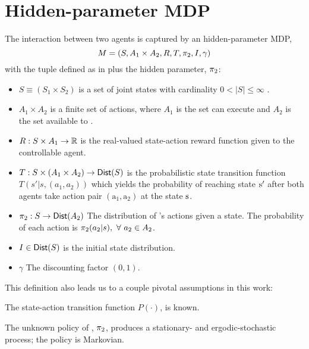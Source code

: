 \section{Hidden-parameter MDP}\label{sec:hipmdp}
    \begin{definition}
        The interaction between two agents is captured by an hidden-parameter \ac{MDP},
        \[
            M = (S, A_1 \times A_2, R, T, \pi_{2}, I , \gamma)
        \]
        with the tuple defined as in \cite{Sugiyama2015StatisticalRL} plus the hidden parameter, $\pi_{2}$:
        \begin{itemize}
                \item $S \equiv (S_1 \times S_2)$ is a set of joint states with cardinality $0 < |S| \leq \infty$ .
            \item $A_1\times A_2$ is a finite set of actions, where $A_1$ is the set  can execute and $A_2$ is
                the set available to .
            \item $R: S\times A_1 \rightarrow \mathbb{R}$ is the real-valued state-action reward function given to the
                controllable agent.
            \item $T: S\times (A_1\times A_2)\rightarrow \mathsf{Dist}(S)$ is the probabilistic state transition function
                $ T(s'| s, (a_1,a_2)) $ which yields the probability of reaching state $\textnormal{s}'$ after both
                agents take action pair $(\text{a}_1,\text{a}_2)$ at the state $\textnormal{s}$.
            \item $\pi_{2} : S \rightarrow \mathsf{Dist}(A_2)$ The distribution of 's actions given a
                state. The probability of each action is $\pi_{2}(a_2|s),\ \forall\ a_2 \in A_2$.
            \item $I \in \mathsf{Dist}(S)$ is the initial state distribution.
            \item $\gamma$ The discounting factor $(0,1)$.
        \end{itemize}
    \end{definition}

    \noindent
    This definition also leads us to a couple pivotal assumptions in this work:

    \begin{assumption}
        The state-action transition function $P(\cdot)$, is known.
    \end{assumption}

    \begin{assumption}
        The unknown policy of , $\pi_{2}$, produces a stationary- and ergodic-stochastic process; the policy
        is Markovian.
    \end{assumption}

